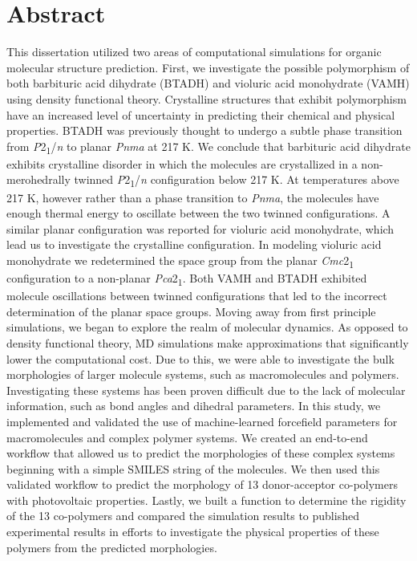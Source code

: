 
\chapter*{Abstract}

This dissertation utilized two areas of computational simulations for organic molecular structure prediction. First, we investigate the possible polymorphism of both barbituric acid dihydrate (BTADH) and violuric acid monohydrate (VAMH) using density functional theory. Crystalline structures that exhibit polymorphism have an increased level of uncertainty in predicting their chemical and physical properties. BTADH was previously thought to undergo a subtle phase transition from \textit{P}2\textsubscript{1}/\textit{n} to planar \textit{Pnma} at 217 K. We conclude that barbituric acid dihydrate exhibits crystalline disorder in which the molecules are crystallized in a non-merohedrally twinned \textit{P}2\textsubscript{1}/\textit{n} configuration below 217 K. At temperatures above 217 K, however rather than a phase transition to \textit{Pnma}, the molecules have enough thermal energy to oscillate between the two twinned configurations. A similar planar configuration was reported for violuric acid monohydrate, which lead us to investigate the crystalline configuration. In modeling violuric acid monohydrate we redetermined the space group from the planar \textit{Cmc}2\textsubscript{1} configuration to a non-planar  \textit{Pca}2\textsubscript{1}. Both VAMH and BTADH exhibited molecule oscillations between twinned configurations that led to the incorrect determination of the planar space groups. 
Moving away from first principle simulations, we began to explore the realm of molecular dynamics. As opposed to density functional theory, MD simulations make approximations that significantly lower the computational cost. Due to this, we were able to investigate the bulk morphologies of larger molecule systems, such as macromolecules and polymers. Investigating these systems has been proven difficult due to the lack of molecular information, such as bond angles and dihedral parameters. In this study, we implemented and validated the use of machine-learned forcefield parameters for macromolecules and complex polymer systems. We created an end-to-end workflow that allowed us to predict the morphologies of these complex systems beginning with a simple SMILES string of the molecules. We then used this validated workflow to predict the morphology of 13 donor-acceptor co-polymers with photovoltaic properties. Lastly, we built a function to determine the rigidity of the 13 co-polymers and compared the simulation results to published experimental results in efforts to investigate the physical properties of these polymers from the predicted morphologies. 

